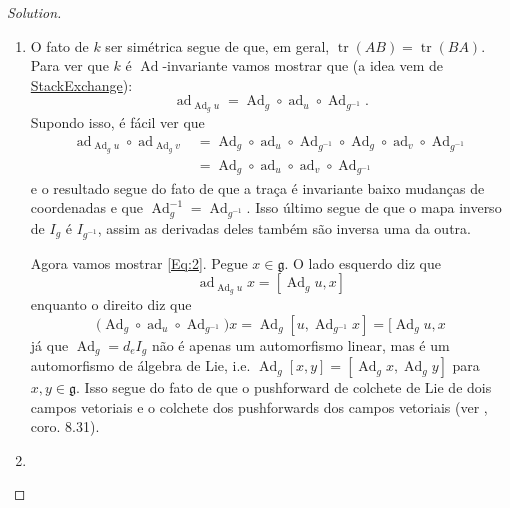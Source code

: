 \begin{proof}[Solution]\leavevmode
	\begin{enumerate}[label=\alph*.]
		\item O fato de $k$ ser simétrica segue de que, em geral, $\operatorname{tr}(AB)=\operatorname{tr}(BA)$. Para ver que $k$ é $\operatorname{Ad}$-invariante vamos mostrar que (a idea vem de \href{https://math.stackexchange.com/questions/2409279/showing-killing-form-is-ad-invariant}{StackExchange}):
	\begin{equation}\label{Eq:2}	\operatorname{ad}_{\operatorname{Ad}_gu}=\operatorname{Ad}_g\circ \operatorname{ad}_u\circ \operatorname{Ad}_{g^{-1}}.
		\end{equation}
			Supondo isso, é fácil ver que
			\begin{align*}
				\operatorname{ad}_{\operatorname{Ad}_gu}\circ \operatorname{ad}_{\operatorname{Ad}_{g}v}&=\operatorname{Ad}_{g}\circ \operatorname{ad}_u\circ \operatorname{Ad}_{g^{-1}}\circ \operatorname{Ad}_g\circ \operatorname{ad}_v\circ \operatorname{Ad}_{g^{-1}}\\
				&=\operatorname{Ad}_g\circ \operatorname{ad}_u\circ \operatorname{ad}_v\circ \operatorname{Ad}_{g^{-1}}
			\end{align*}
			e o resultado segue do fato de que a traça é invariante baixo mudanças de coordenadas e que $\operatorname{Ad}_g^{-1}=\operatorname{Ad}_{g^{-1}}$. Isso último segue de que o mapa inverso de $I_g$  é $I_{g^{-1}}$, assim as derivadas deles também são inversa uma da outra.

			Agora vamos mostrar \cref{Eq:2}. Pegue $x\in\mathfrak{g}$. O lado esquerdo diz que
			\[\operatorname{ad}_{\operatorname{Ad}_gu}x=[\operatorname{Ad}_gu,x]\]
			enquanto o direito diz que
			\[\Big(\operatorname{Ad}_g\circ \operatorname{ad}_u\circ \operatorname{Ad}_{g^{-1}}\Big)x=\operatorname{Ad}_g[u,\operatorname{Ad}_{g^{-1}}x]=[\operatorname{Ad}_gu,x\]
			já que $\operatorname{Ad}_g=d_eI_g$ não é apenas um automorfismo linear, mas é um automorfismo de álgebra de Lie, i.e. $\operatorname{Ad}_g[x,y]=[\operatorname{Ad}_gx,\operatorname{Ad}_gy]$ para $x,y\in\mathfrak{g}$. Isso segue do fato de que o pushforward de colchete de Lie de dois campos vetoriais e o colchete dos pushforwards dos campos vetoriais (ver \cite{lee}, coro. 8.31).
		
\item 
	\end{enumerate}
\end{proof}

